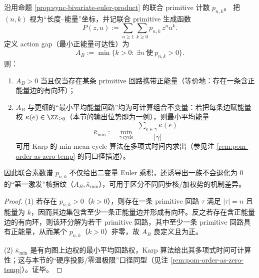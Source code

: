 \begin{proposition}\label{prop:sync-action-gap}
沿用命题 \ref{prop:sync-bivariate-euler-product} 的联合 primitive 计数 \(p_{n,k}\)。
把 \((n,k)\) 视为“长度--能量”坐标，并记联合 primitive 生成函数
\[
P(z,u):=\sum_{n\ge 1}\sum_{k\ge 0}p_{n,k}\,z^n u^k.
\]
定义 action gap（最小正能量可达性）为
\[
A_B:=\min\{k>0:\ \exists n\ \text{使}\ p_{n,k}>0\}.
\]
则：
\begin{enumerate}
  \item \(A_B>0\) 当且仅当存在某条 primitive 回路携带正能量（等价地：存在一条含正能量边的有向环）；
  \item \(A_B\) 与更细的“最小平均能量回路”均为可计算组合不变量：若把每条边赋能量权 \(\kappa(e)\in\ZZ_{\ge 0}\)（本节的输出位势即为一例），则最小平均能量
  \[
  \bar\kappa_{\min}:=\min_{\gamma\ \mathrm{cycle}}\ \frac{\sum_{e\in\gamma}\kappa(e)}{|\gamma|}
  \]
  可用 Karp 的 min-mean-cycle 算法在多项式时间内求出（参见注 \ref{rem:pom-order-as-zero-temp} 的同口径描述）。
\end{enumerate}
因此联合素数谱 \(p_{n,k}\) 不仅给出二变量 Euler 乘积，还诱导出一族不会退化为 \(0\) 的“第一激发”核指纹（\(A_B,\bar\kappa_{\min}\)），可用于区分不同同步核/加权势的机制差异。
\end{proposition}
\begin{proof}
(1) 若存在 \(p_{n,k}>0\)（\(k>0\)），则存在一条 primitive 回路 \(\tau\) 满足 \(|\tau|=n\) 且能量为 \(k\)，因而其边集包含至少一条正能量边并形成有向环。反之若存在含正能量边的有向环，则该环分解为若干 primitive 回路，其中至少一条 primitive 回路具有正能量，从而某个 \(p_{n,k}\)（\(k>0\)）非零，故 \(A_B\) 良定义且为正。

(2) \(\bar\kappa_{\min}\) 是有向图上边权的最小平均回路权，Karp 算法给出其多项式时间可计算性；这与本节的“硬序投影/零温极限”口径同型（见注 \ref{rem:pom-order-as-zero-temp}）。证毕。
\end{proof}

